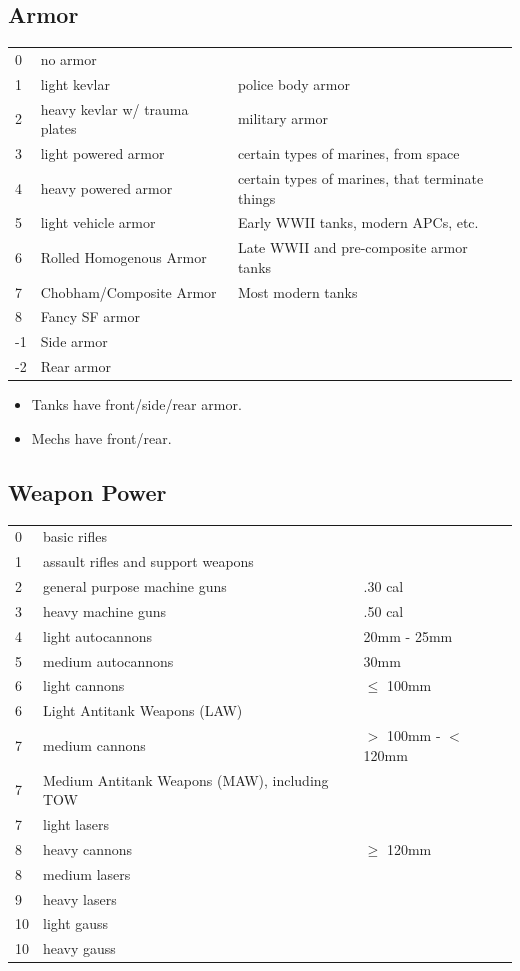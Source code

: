 \documentclass[12pt,titlepage]{article}
\begin{document}
  \subsection{Armor}
  \begin{tabular}{lll}
    0 & no armor & \\
    1 & light kevlar & police body armor \\
    2 & heavy kevlar w/ trauma plates & military armor \\
    3 & light powered armor & certain types of marines, from space \\
    4 & heavy powered armor & certain types of marines, that terminate
    things \\
    5 & light vehicle armor & Early WWII tanks, modern APCs, etc. \\
    6 & Rolled Homogenous Armor & Late WWII and pre-composite armor
    tanks \\
    7 & Chobham/Composite Armor & Most modern tanks \\
    8 & Fancy SF armor & \\
    -1 & Side armor & \\
    -2 & Rear armor & \\
  \end{tabular}

  \begin{itemize}
    \item Tanks have front/side/rear armor.
    \item Mechs have front/rear.
  \end{itemize}

  \subsection{Weapon Power}
  \begin{tabular}{lll}
    0 & basic rifles & \\
    1 & assault rifles and support weapons & \\
    2 & general purpose machine guns & .30 cal \\
    3 & heavy machine guns & .50 cal \\
    4 & light autocannons & 20mm - 25mm \\
    5 & medium autocannons & 30mm \\
    6 & light cannons & $\leq$ 100mm \\
    6 & Light Antitank Weapons (LAW) & \\
    7 & medium cannons & $>$ 100mm - $<$ 120mm \\
    7 & Medium Antitank Weapons (MAW), including TOW & \\
    7 & light lasers \\
    8 & heavy cannons & $\geq$ 120mm \\
    8 & medium lasers & \\
    9 & heavy lasers & \\
    10 & light gauss & \\
    10 & heavy gauss & \\
  \end{tabular}
\end{document}
